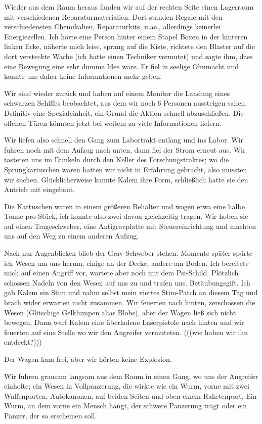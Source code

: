 \documentclass[11pt]{scrartcl}
\begin{document}
Wieder aus dem Raum heraus fanden wir auf der rechten Seite einen
Lagerraum mit verschiedenen Reparaturmaterialien. Dort standen Regale
mit den verschiedensten Chemikalien, Reparaturkits, u.ae., allerdings
keinerlei Energiezellen. Ich hörte eine Person hinter einem Stapel Boxen
in der hinteren linken Ecke, näherte mich leise, sprang auf die Kiste,
richtete den Blaster auf die dort versteckte Wache (ich hatte einen
Techniker vermutet) und sagte ihm, dass eine Bewegung eine sehr dumme
Idee wäre. Er fiel in seelige Ohnmacht und konnte uns daher keine
Informationen mehr geben.

Wir sind wieder zurück und haben auf einem Monitor die Landung eines
schwarzen Schiffes beobachtet, aus dem wir noch 6 Personen aussteigen
sahen. Definitiv eine Spezialeinheit, ein Grund die Aktion schnell
abzuschließen. Die offenen Türen könnten jetzt bei weitem zu viele
Informationen liefern.

Wir liefen also schnell den Gang zum Labortrakt entlang und ins Labor.
Wir fuhren noch mit dem Aufzug nach unten, dann fiel der Strom erneut
aus. Wir tasteten uns im Dunkeln durch den Keller des Forschungstraktes;
wo die Sprungkartuschen waren hatten wir nicht in Erfahrung gebracht,
also mussten wir suchen. Glücklicherweise kannte Kalem ihre Form,
schließlich hatte sie den Antrieb mit eingebaut.

Die Kartuschen waren in einem größeren Behälter und wogen etwa eine
halbe Tonne pro Stück, ich konnte also zwei davon gleichzeitig tragen.
Wir hoben sie auf einen Trageschweber, eine Antigravplatte mit
Steuereinrichtung und machten uns auf den Weg zu einem anderen Aufzug.

Nach nur Augenblicken blieb der Grav-Schweber stehen. Momente später
spürte ich Wesen um uns herum, einige an der Decke, andere am Boden. Ich
bereitete mich auf einen Angriff vor, wartete aber noch mit dem
Psi-Schild. Plötzlich schossen Nadeln von den Wesen auf uns zu und
trafen uns. Betäubungsgift. Ich gab Kalem ein Stim und nahm selbst mein
viertes Stim-Patch an diesem Tag und brach wider erwarten nicht
zusammen. Wir feuerten nach hinten, zerschossen die Wesen (Glitschige
Gelklumpen alias Blobs), aber der Wagen ließ sich nicht bewegen, Dann
warf Kalem eine überladene Laserpistole nach hinten und wir feuerten auf
eine Stelle wo wir den Angreifer vermuteten. (((wie haben wir ihn
entdeckt?)))

Der Wagen kam frei, aber wir hörten keine Explosion.

Wir fuhren grausam langsam aus dem Raum in einen Gang, wo uns der
Angreifer einholte; ein Wesen in Vollpanzerung, die wirkte wie ein Wurm,
vorne mit zwei Waffenporten, Autokanonen, auf beiden Seiten und oben
einem Raketenport. Ein Wurm, an dem vorne ein Mensch hängt, der schwere
Panzerung trägt oder ein Panzer, der so erscheinen soll.
\end{document}
